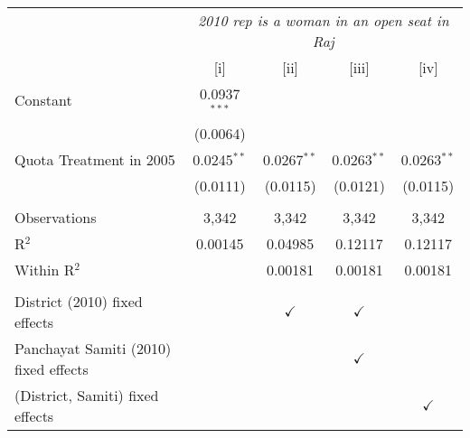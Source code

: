 
\begingroup
\centering
\begin{tabular}{lcccc}
   \toprule
    & \multicolumn{4}{c}{\textit{2010 rep is a woman in an open seat in Raj}}\\
                                         & [i]            & [ii]          & [iii]         & [iv]\\  
   \midrule 
   Constant                              & 0.0937$^{***}$ &               &               &   \\   
                                         & (0.0064)       &               &               &   \\   
   Quota Treatment in 2005               & 0.0245$^{**}$  & 0.0267$^{**}$ & 0.0263$^{**}$ & 0.0263$^{**}$\\   
                                         & (0.0111)       & (0.0115)      & (0.0121)      & (0.0115)\\   
    \\
   Observations                          & 3,342          & 3,342         & 3,342         & 3,342\\  
   R$^2$                                 & 0.00145        & 0.04985       & 0.12117       & 0.12117\\  
   Within R$^2$                          &                & 0.00181       & 0.00181       & 0.00181\\  
    \\
   District (2010) fixed effects         &                & $\checkmark$  & $\checkmark$  & \\  
   Panchayat Samiti (2010) fixed effects &                &               & $\checkmark$  & \\  
   (District, Samiti) fixed effects      &                &               &               & $\checkmark$\\   
   \bottomrule
\end{tabular}
\par\endgroup


